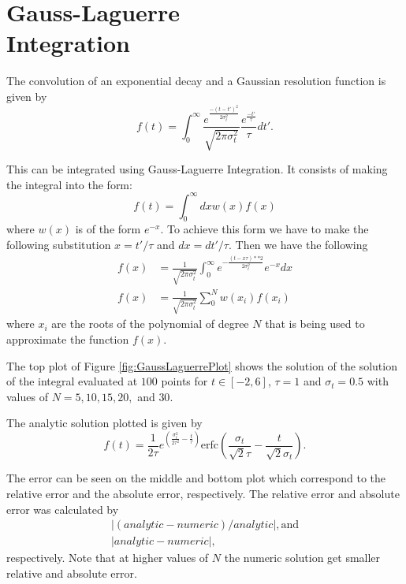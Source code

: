 \section{Gauss-Laguerre \\ Integration}

The convolution of an exponential decay and a Gaussian resolution function is given by
\begin{equation}
    f(t)=\int^\infty_0 \frac{e^{\frac{-(t-t')^2}{2\sigma^2_t}}}{\sqrt{2\pi\sigma^2_t}}\frac{e^{\frac{-t'}{\tau}}}{\tau}dt'.
    \label{eq:convolution}
\end{equation}

This can be integrated using Gauss-Laguerre Integration. It consists of making the integral into the form:
\begin{equation}
    f(t)=\int^\infty_0 dx w(x) f(x)
\end{equation}
where $w(x)$ is of the form $e^{-x}$. To achieve this form we have to make the following substitution $x=t'/\tau$ and $dx=dt'/\tau$. Then we have the following
\begin{align*}
    f(x)&=\frac{1}{\sqrt{2\pi\sigma_t^2}}\int^\infty_0 e^{-\frac{(t-x\tau)**2}{2\sigma_t^2}}e^{-x} dx\\
    f(x)&=\frac{1}{\sqrt{2\pi\sigma_t^2}}\sum_0^N w(x_i)f(x_i)
\end{align*}
where $x_i$ are the roots of the polynomial of degree $N$ that is being used to approximate the function $f(x)$.

The top plot of Figure \ref{fig:GaussLaguerrePlot} shows the solution of the solution of the integral evaluated at $100$ points for $t\in[-2,6]$, $\tau=1$ and $\sigma_t=0.5$ with values of $N=5,10,15,20,$ and $30$. 

The analytic solution plotted is given by
\begin{equation}
    f(t)=\frac{1}{2\tau}e^{\left(\frac{\sigma^2_t}{2\tau^2}-\frac{t}{\tau}\right)}\mathrm{erfc}\left(\frac{\sigma_t}{\sqrt{2}\tau}-\frac{t}{\sqrt{2}\sigma_t}\right).
    \label{eq:convAnalytic}
\end{equation}

The error can be seen on the middle and bottom plot which correspond to the relative error and the absolute error, respectively. The relative error and absolute error was calculated by 
\begin{align*}
    |(analytic-numeric)/analytic|, \mathrm{and}\\
    |analytic-numeric|,
\end{align*}
respectively. Note that at higher values of $N$ the numeric solution get smaller relative and absolute error.

